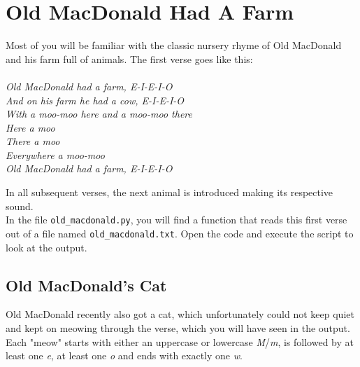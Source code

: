 \cprotect{}

\FloatBarrier

\section{Old MacDonald Had A Farm}
Most of you will be familiar with the classic nursery rhyme of Old MacDonald and his farm full of animals. The first verse goes like this:\\\\
\textit{Old MacDonald had a farm, E-I-E-I-O\\
And on his farm he had a cow, E-I-E-I-O\\
With a moo-moo here and a moo-moo there\\
Here a moo\\
There a moo\\
Everywhere a moo-moo\\
Old MacDonald had a farm, E-I-E-I-O\\
}

\noindent In all subsequent verses, the next animal is introduced making its respective sound.\\
In the file \texttt{old\_macdonald.py}, you will find a function that reads this first verse out of a file named \texttt{old\_macdonald.txt}. Open the code and execute the script to look at the output.

\subsection{Old MacDonald's Cat}
Old MacDonald recently also got a cat, which unfortunately could not keep quiet and kept on meowing through the verse, which you will have seen in the output.\\
Each "meow" starts with either an uppercase or lowercase \textit{M}/\textit{m}, is followed by at least one \textit{e}, at least one \textit{o} and ends with exactly one \textit{w}.\\


